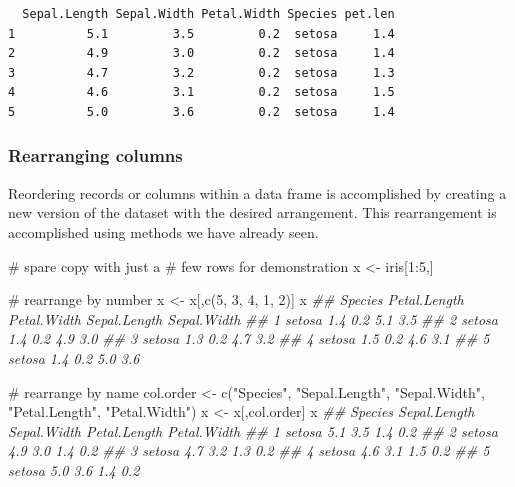 \documentclass[
  13,
  letterpaper,
]{report}
\newenvironment{Shaded}{\begin{snugshade}}{\end{snugshade}}
\newcommand{\CommentTok}[1]{\textcolor[rgb]{0.37,0.37,0.37}{#1}}
\newcommand{\DecValTok}[1]{\textcolor[rgb]{0.68,0.00,0.00}{#1}}
\newcommand{\DocumentationTok}[1]{\textcolor[rgb]{0.37,0.37,0.37}{\textit{#1}}}
\newcommand{\FunctionTok}[1]{\textcolor[rgb]{0.28,0.35,0.67}{#1}}
\newcommand{\NormalTok}[1]{\textcolor[rgb]{0.00,0.23,0.31}{#1}}
\newcommand{\OtherTok}[1]{\textcolor[rgb]{0.00,0.23,0.31}{#1}}
\newcommand{\SpecialCharTok}[1]{\textcolor[rgb]{0.37,0.37,0.37}{#1}}
\newcommand{\StringTok}[1]{\textcolor[rgb]{0.13,0.47,0.30}{#1}}
\begin{document}
\begin{verbatim}
  Sepal.Length Sepal.Width Petal.Width Species pet.len
1          5.1         3.5         0.2  setosa     1.4
2          4.9         3.0         0.2  setosa     1.4
3          4.7         3.2         0.2  setosa     1.3
4          4.6         3.1         0.2  setosa     1.5
5          5.0         3.6         0.2  setosa     1.4
\end{verbatim}

\subsubsection{Rearranging columns}\label{sec-manip-df-com-rearr}

Reordering records or columns within a data frame is accomplished by
creating a new version of the dataset with the desired arrangement. This
rearrangement is accomplished using methods we have already seen.

\begin{Shaded}
\begin{Highlighting}[]

\CommentTok{\# spare copy with just a }
\CommentTok{\# few rows for demonstration}
\NormalTok{x }\OtherTok{\textless{}{-}}\NormalTok{ iris[}\DecValTok{1}\SpecialCharTok{:}\DecValTok{5}\NormalTok{,] }

\CommentTok{\# rearrange by number}
\NormalTok{x }\OtherTok{\textless{}{-}}\NormalTok{ x[,}\FunctionTok{c}\NormalTok{(}\DecValTok{5}\NormalTok{, }\DecValTok{3}\NormalTok{, }\DecValTok{4}\NormalTok{, }\DecValTok{1}\NormalTok{, }\DecValTok{2}\NormalTok{)]}
\NormalTok{x}
\DocumentationTok{\#\#   Species Petal.Length Petal.Width Sepal.Length Sepal.Width}
\DocumentationTok{\#\# 1  setosa          1.4         0.2          5.1         3.5}
\DocumentationTok{\#\# 2  setosa          1.4         0.2          4.9         3.0}
\DocumentationTok{\#\# 3  setosa          1.3         0.2          4.7         3.2}
\DocumentationTok{\#\# 4  setosa          1.5         0.2          4.6         3.1}
\DocumentationTok{\#\# 5  setosa          1.4         0.2          5.0         3.6}

\CommentTok{\# rearrange by name}
\NormalTok{col.order }\OtherTok{\textless{}{-}} \FunctionTok{c}\NormalTok{(}\StringTok{"Species"}\NormalTok{, }\StringTok{"Sepal.Length"}\NormalTok{, }\StringTok{"Sepal.Width"}\NormalTok{, }
               \StringTok{"Petal.Length"}\NormalTok{, }\StringTok{"Petal.Width"}\NormalTok{)}
\NormalTok{x }\OtherTok{\textless{}{-}}\NormalTok{ x[,col.order]}
\NormalTok{x}
\DocumentationTok{\#\#   Species Sepal.Length Sepal.Width Petal.Length Petal.Width}
\DocumentationTok{\#\# 1  setosa          5.1         3.5          1.4         0.2}
\DocumentationTok{\#\# 2  setosa          4.9         3.0          1.4         0.2}
\DocumentationTok{\#\# 3  setosa          4.7         3.2          1.3         0.2}
\DocumentationTok{\#\# 4  setosa          4.6         3.1          1.5         0.2}
\DocumentationTok{\#\# 5  setosa          5.0         3.6          1.4         0.2}
\end{Highlighting}
\end{Shaded}
\end{document}
